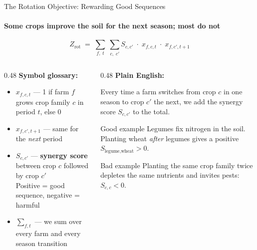 \begin{frame}{The Rotation Objective: Rewarding Good Sequences}
    \framesubtitle{Some crops improve the soil for the next season; most do not}

    \begin{equation*}
        Z_{\text{rot}} \;=\;
        \sum_{f,\;t} \;\sum_{c,\;c'}
        S_{c,c'} \;\cdot\; x_{f,c,t} \;\cdot\; x_{f,c',t+1}
    \end{equation*}

    \vspace{0.4cm}
    \begin{columns}[T]
        \begin{column}{0.48\textwidth}
            \textbf{Symbol glossary:}
            \vspace{0.2cm}
            \begin{itemize}
                \item $x_{f,c,t}$ — 1 if farm $f$ grows crop family
                      $c$ in period $t$, else 0
                \item $x_{f,c',t+1}$ — same for the \emph{next} period
                \item $S_{c,c'}$ — \textbf{synergy score} between
                      crop $c$ followed by crop $c'$\\
                      {\small Positive = good sequence,
                       negative = harmful}
                \item $\sum_{f,t}$ — we sum over every farm
                      and every season transition
            \end{itemize}
        \end{column}
        \begin{column}{0.48\textwidth}
            \textbf{Plain English:}
            \vspace{0.2cm}

            Every time a farm switches from crop $c$ in one
            season to crop $c'$ the next, we add the synergy
            score $S_{c,c'}$ to the total.

            \vspace{0.3cm}
            \begin{exampleblock}{Good example}
                \small Legumes fix nitrogen in the soil.
                Planting wheat \emph{after} legumes gives a
                positive $S_{\text{legume,wheat}} > 0$.
            \end{exampleblock}
            \begin{alertblock}{Bad example}
                \small Planting the same crop family twice
                depletes the same nutrients and invites pests:
                $S_{c,c} < 0$.
            \end{alertblock}
        \end{column}
    \end{columns}
\end{frame}

